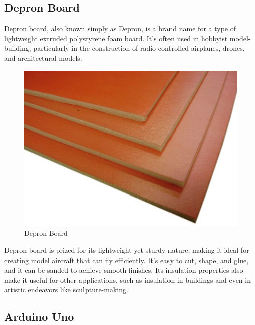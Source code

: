 \documentclass[conference]{IEEEtran}
\begin{document}
\subsection{Depron Board}

Depron board, also known simply as Depron, is a brand name for a type of lightweight extruded polystyrene foam board. It's often used in hobbyist model-building, particularly in the construction of radio-controlled airplanes, drones, and architectural models.
\begin{figure}[th]
    \centering
    \includegraphics[width=\linewidth]{images/Depron Board.jpg}
    \caption{Depron Board}
    \label{fig:enter-label}
\end{figure}

Depron board is prized for its lightweight yet sturdy nature, making it ideal for creating model aircraft that can fly efficiently. It's easy to cut, shape, and glue, and it can be sanded to achieve smooth finishes. Its insulation properties also make it useful for other applications, such as insulation in buildings and even in artistic endeavors like sculpture-making.


\subsection{Arduino Uno}
\end{document}
